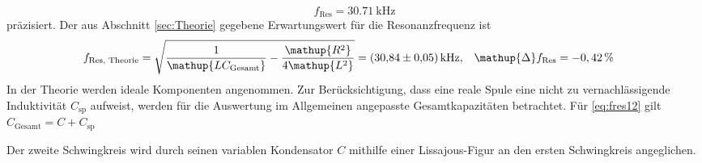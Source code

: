 \begin{equation}
	f_\text{Res} = \SI{30.71}{\kilo\hertz}
\end{equation} präzisiert.
Der aus Abschnitt \ref{sec:Theorie} gegebene Erwartungswert für die Resonanzfrequenz ist
\begin{alignat}{2}
	f_\text{Res, Theorie} = \sqrt{\frac{1}{\mathup{LC_\text{Gesamt}}}-\frac{\mathup{R^2}}{4\mathup{L^2}}} = \SI{30.84\pm0.05}{\kilo\hertz}, &\quad\mathup{\Delta}f_\text{Res}=-0,42\,\%
	\label{eq:fres12}
\end{alignat}
In der Theorie werden ideale Komponenten angenommen.
Zur Berücksichtigung, dass eine reale Spule eine nicht zu vernachlässigende Induktivität $C_\text{sp}$ aufweist, werden für die Auswertung im Allgemeinen angepasste Gesamtkapazitäten betrachtet. Für \eqref{eq:fres12} gilt $C_\text{Gesamt}= C+C_\text{sp}$

Der zweite Schwingkreis wird durch seinen variablen Kondensator $C$ mithilfe einer Lissajous-Figur an den ersten Schwingkreis angeglichen.
